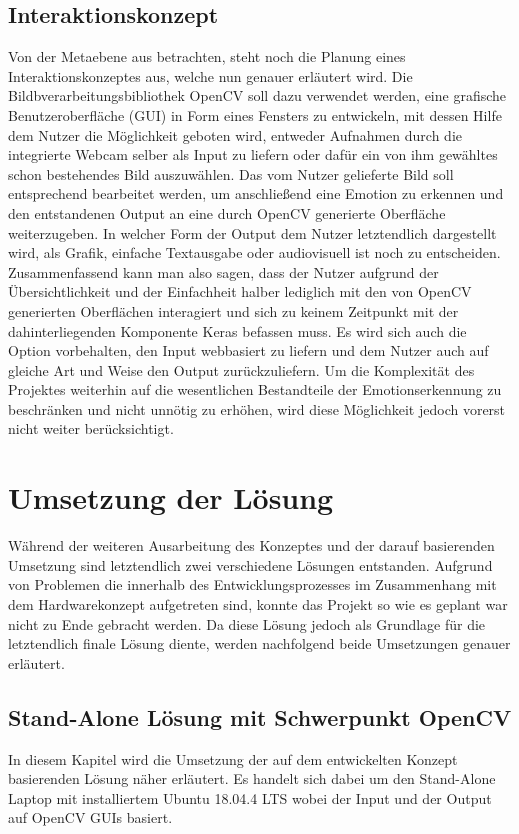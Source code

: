 \documentclass[12pt, a4paper]{scrbook}
\begin{document}
\subsection{Interaktionskonzept}
Von der Metaebene aus betrachten, steht noch die Planung eines Interaktionskonzeptes aus, welche nun genauer erläutert wird. Die Bildbverarbeitungsbibliothek OpenCV soll dazu verwendet werden, eine grafische Benutzeroberfläche (GUI) in Form eines Fensters zu entwickeln, mit dessen Hilfe dem Nutzer die Möglichkeit geboten wird, entweder Aufnahmen durch die integrierte Webcam selber als Input zu liefern oder dafür ein von ihm gewähltes schon bestehendes Bild auszuwählen. Das vom Nutzer gelieferte Bild soll entsprechend bearbeitet werden, um anschließend eine Emotion zu erkennen und den entstandenen Output an eine durch OpenCV generierte Oberfläche weiterzugeben. In welcher Form der Output dem Nutzer letztendlich dargestellt wird, als Grafik, einfache Textausgabe oder audiovisuell ist noch zu entscheiden.\newline
Zusammenfassend kann man also sagen, dass der Nutzer aufgrund der Übersichtlichkeit und der Einfachheit halber lediglich mit den von OpenCV generierten Oberflächen interagiert und sich zu keinem Zeitpunkt mit der dahinterliegenden Komponente Keras befassen muss.\newline
Es wird sich auch die Option vorbehalten, den Input webbasiert zu liefern und dem Nutzer auch auf gleiche Art und Weise den Output zurückzuliefern. Um die Komplexität des Projektes weiterhin auf die wesentlichen Bestandteile der Emotionserkennung zu beschränken und nicht unnötig zu erhöhen, wird diese Möglichkeit jedoch vorerst nicht weiter berücksichtigt.

\section{Umsetzung der Lösung}
Während der weiteren Ausarbeitung des Konzeptes und der darauf basierenden Umsetzung sind letztendlich zwei verschiedene Lösungen entstanden. Aufgrund von Problemen die innerhalb des Entwicklungsprozesses im Zusammenhang mit dem Hardwarekonzept aufgetreten sind, konnte das Projekt so wie es geplant war nicht zu Ende gebracht werden. Da diese Lösung jedoch als Grundlage für die letztendlich finale Lösung diente, werden nachfolgend beide Umsetzungen genauer erläutert.

\subsection{Stand-Alone Lösung mit Schwerpunkt OpenCV}
In diesem Kapitel wird die Umsetzung der auf dem entwickelten Konzept basierenden Lösung näher erläutert. Es handelt sich dabei um den Stand-Alone Laptop mit installiertem Ubuntu 18.04.4 LTS wobei der Input und der Output auf OpenCV GUIs basiert.
\end{document}
